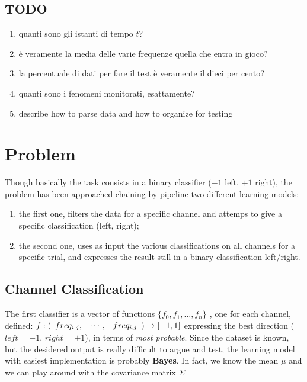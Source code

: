 \documentclass[10pt]{article}
\begin{document}
\subsection{TODO}
\begin{enumerate}
\item quanti sono gli istanti di tempo $t$?
\item \`e veramente la media delle varie frequenze quella che entra in gioco? 
\item la percentuale di dati per fare il test \`e veramente il dieci per cento?
\item quanti sono i fenomeni monitorati, esattamente?
\item describe how to parse data and how to organize for testing
\end{enumerate}




\section{Problem}
Though basically the task consists in a binary classifier ($-1$ left, $+1$ right), the problem has been approached chaining by pipeline two different learning models:
\begin{enumerate}
\item the first one, filters the data for a specific channel and attemps to give a specific classification (left, right); 
\item the second one, uses as input the various classifications on all channels for a specific trial, and expresses the result still in a binary classification left/right.
\end{enumerate}


\subsection{Channel Classification}

The first classifier is a vector of functions
$ \{f_0, f_1, \dots, f_n \}$ 
, one for each channel, defined:
$ f: (\begin{array}{l l l} freq_{i, j}, & \cdots, & freq_{i, j} \end{array}) \to [-1, 1]  $
 expressing the best direction ($left=-1$, $right=+1$), in terms of \textit{most probable}. Since the dataset is known, but the desidered output is really difficult to argue and test, the learning model with easiest implementation is probably \textbf{Bayes}. In fact, we know the mean $\mu$ and we can play around with the covariance matrix $\Sigma$
\end{document}
